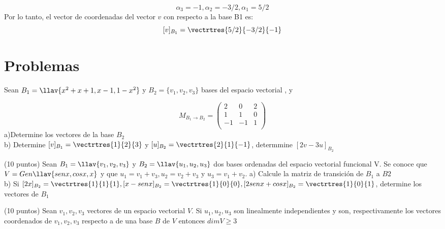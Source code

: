 \begin{ejercicio}
\[\alpha_3=-1, \alpha_2=-3/2, \alpha_1=5/2\]
Por lo tanto, el vector de coordenadas del vector $v$ con respecto a la base B1 es:
\[[v]_{B_1}=\vectrtres{5/2}{-3/2}{-1}\]


\end{ejercicio}

\section{Problemas}
\begin{enumerate}

\begin{prob}[]

Sean $B_1=\llav{x^2+x+1, x-1, 1-x^2}$ y $B_2=\{v_1, v_2, v_3\}$ bases del espacio vectorial \pdos, y 

\[M_{B_1 \rightarrow B_2}=\left(\begin{array}{rrr}
2&0&2\\
1&1&0\\
-1&-1&1\\
\end{array}\right)\]
a)Determine los vectores de la base $B_2$
~\\b) Determine $[v]_{B_1}=\vectrtres{1}{2}{3}$ y $[u]_{B_2}=\vectrtres{2}{1}{-1}$, determmine $[2v-3u]_{B_2}$
\end{prob}

\begin{prob}
(10 puntos) Sean $B_1=\llav{v_1, v_2, v_3}$ y $B_2=\llav{u_1, u_2, u_3}$ dos bases ordenadas del espacio vectorial funcional V. Se conoce que $V=Gen\llav{senx, cosx, x}$ y que $u_1=v_1+v_3, u_2=v_2+v_3 $ y $u_3= v_1+v_2$.
a) Calcule la matriz de transición de $B_1$ a $B2$ ~\\
b) Si $[2x]_{B_2}=\vectrtres{1}{1}{1}, [x-senx]_{B_2}=\vectrtres{1}{0}{0}, [2senx+cosx]_{B_2}=\vectrtres{1}{0}{1}$, determine los vectores de $B_1$
\end{prob}



\begin{prob}
(10 puntos) Sean $v_1, v_2, v_3 $ vectores de un espacio vectorial $V$. Si $u_1, u_2, u_3 $ son linealmente independientes y son, respectivamente los vectores coordenados de $ v_1, v_2, v_3$ respecto a de una base $ B $ de $V$ entonces $dim V \geq 3 $
\end{prob}


\end{enumerate}